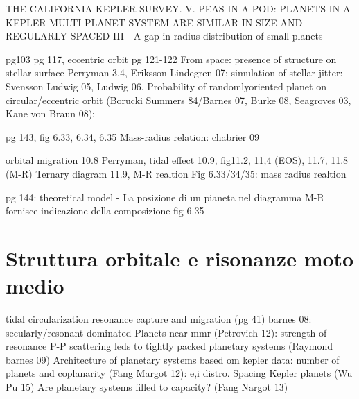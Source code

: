 \begin{workout}
THE CALIFORNIA-KEPLER SURVEY. V. PEAS IN A POD: PLANETS IN A KEPLER MULTI-PLANET SYSTEM ARE SIMILAR IN SIZE AND REGULARLY SPACED
						 III - A gap in radius distribution of small planets
\end{workout}

\begin{workout}
pg103
pg 117, eccentric orbit pg 121-122
From space: presence of structure on stellar surface Perryman 3.4, Eriksson Lindegren 07; simulation of stellar jitter: Svensson Ludwig 05, Ludwig 06.
Probability of randomlyoriented planet on circular/eccentric orbit (Borucki Summers 84/Barnes 07, Burke 08,  Seagroves 03, Kane von Braun 08):
\end{workout}

\begin{workout}
pg 143, fig 6.33, 6.34, 6.35
Mass-radius relation: chabrier 09
\end{workout}

\begin{workout}[M-R diagram]
orbital migration 10.8 Perryman, tidal effect 10.9, 
fig11.2, 11,4 (EOS), 11.7, 11.8 (M-R)
Ternary diagram 11.9, M-R realtion
Fig 6.33/34/35: mass radius realtion

pg 144: theoretical model - La posizione di un pianeta nel diagramma M-R fornisce indicazione della composizione
fig 6.35
\end{workout}

\section{Struttura orbitale e risonanze moto medio}

\begin{workout}
tidal circularization
resonance capture and migration (pg 41)
barnes 08: secularly/resonant dominated
Planets near mmr (Petrovich 12): strength of resonance
P-P scattering leds to tightly packed planetary systems (Raymond barnes 09)
Architecture of planetary systems based om kepler data: number of planets and coplanarity (Fang Margot 12): e,i distro.
Spacing Kepler planets (Wu Pu 15)
Are planetary systems filled to capacity? (Fang Nargot 13)
\end{workout}


